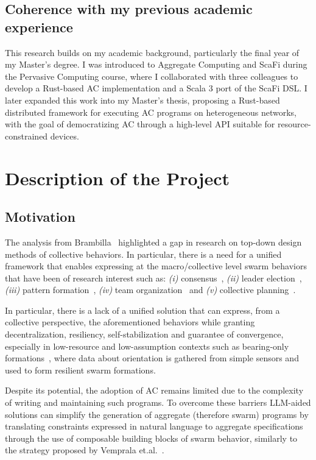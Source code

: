 \documentclass[12pt]{article}
\begin{document}
\subsection{Coherence with my previous academic experience}
\label{sec:coherence}
This research builds on my academic background, particularly the final year of my Master’s degree. I was introduced to Aggregate Computing and ScaFi during the Pervasive Computing course, where I collaborated with three colleagues to develop a Rust-based AC implementation and a Scala 3 port of the ScaFi DSL. I later expanded this work into my Master’s thesis, proposing a Rust-based distributed framework for executing AC programs on heterogeneous networks, with the goal of democratizing AC through a high-level API suitable for resource-constrained devices.
\section{Description of the Project}
\subsection{Motivation}
The analysis from Brambilla~\cite{brambilla2013swarm} highlighted a gap in research on top-down design methods of collective behaviors.
In particular, there is a need for a unified framework that enables expressing at the macro/collective level swarm behaviors that have
been of research interest such as:
\textit{(i)} consensus~\cite{valentini2017achieving}, \textit{(ii)} leader election~\cite{karpov2015leader}, \textit{(iii)} pattern formation~\cite{sahin2002swarm},
\textit{(iv)} team organization~\cite{nouyan2009teamwork} and \textit{(v)} collective planning~\cite{sampedro2016flexible}.

In particular, there is a lack of a unified solution that can express, from a collective perspective, the aforementioned behaviors while granting decentralization, 
resiliency, self-stabilization and guarantee of convergence, especially in low-resource and low-assumption contexts such as
bearing-only formations~\cite{zhao2021bearing}, where data about orientation is gathered from simple sensors and used to form resilient swarm formations.

Despite its potential, the adoption of AC remains limited due to the complexity of writing and maintaining such programs. To overcome these barriers
LLM-aided solutions can simplify the generation of aggregate (therefore swarm) programs by translating constraints expressed in natural language to aggregate specifications
through the use of composable building blocks of swarm behavior, similarly to the strategy proposed by Vemprala et.al.~\cite{vemprala2024chatgpt}.
\end{document}
